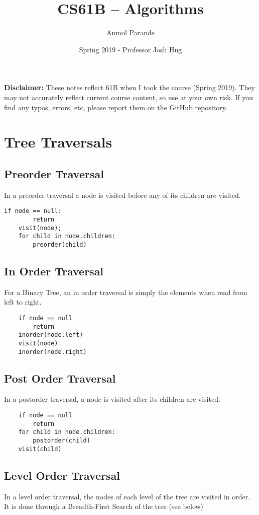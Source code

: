 \documentclass{article}
\begin{document}
    \title{CS61B -- Algorithms}
    \author{Anmol Parande}
    \date{Spring 2019 - Professor Josh Hug}
\maketitle
\tableofcontents
\textbf{Disclaimer: }These notes reflect 61B when I took the course (Spring 2019). They may not accurately reflect current course content, so use at your own risk.
If you find any typos, errors, etc, please report them on the \href{https://github.com/parandea17/BerkeleyNotes}{GitHub repository}.\\
\section{Tree Traversals}
\subsection{Preorder Traversal}
In a preorder traversal a node is visited before any of its children are visited.
\begin{lstlisting}[]
    if node == null:
        return
    visit(node);
    for child in node.children:
        preorder(child)
\end{lstlisting}
\subsection{In Order Traversal}
For a Binary Tree, an in order traversal is simply the elements when read from left to right.
\begin{lstlisting}
    if node == null
        return
    inorder(node.left)
    visit(node)
    inorder(node.right)
\end{lstlisting}
\subsection{Post Order Traversal}
In a postorder traversal, a node is visited after its children are visited.
\begin{lstlisting}
    if node == null
        return
    for child in node.children:
        postorder(child)
    visit(child)
\end{lstlisting}
\subsection{Level Order Traversal}
In a level order traversal, the nodes of each level of the tree are visited in order.
It is done through a Breadth-First Search of the tree (see below)
\end{document}
